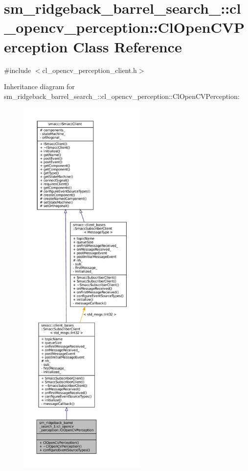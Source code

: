 \hypertarget{classsm__ridgeback__barrel__search__1_1_1cl__opencv__perception_1_1ClOpenCVPerception}{}\section{sm\+\_\+ridgeback\+\_\+barrel\+\_\+search\+\_\+:\+:cl\+\_\+opencv\+\_\+perception\+:\+:Cl\+Open\+C\+V\+Perception Class Reference}
\label{classsm__ridgeback__barrel__search__1_1_1cl__opencv__perception_1_1ClOpenCVPerception}


{\ttfamily \#include $<$cl\+\_\+opencv\+\_\+perception\+\_\+client.\+h$>$}



Inheritance diagram for sm\+\_\+ridgeback\+\_\+barrel\+\_\+search\+\_\+:\+:cl\+\_\+opencv\+\_\+perception\+:\+:Cl\+Open\+C\+V\+Perception\+:
\nopagebreak
\begin{figure}[H]
\begin{center}
\leavevmode
\includegraphics[height=550pt]{classsm__ridgeback__barrel__search__1_1_1cl__opencv__perception_1_1ClOpenCVPerception__inherit__graph}
\end{center}
\end{figure}


